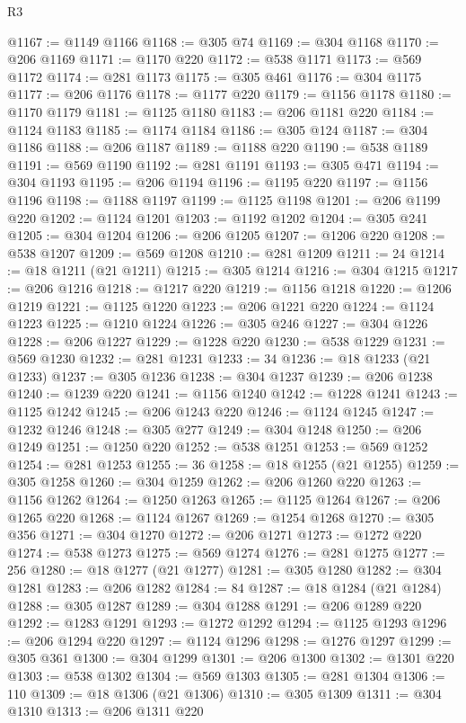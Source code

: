 \begin{lexlean}{R3}
\begin{coremodule}
@1167 := @1149 @1166
@1168 := @305 @74
@1169 := @304 @1168
@1170 := @206 @1169
@1171 := @1170 @220
@1172 := @538 @1171
@1173 := @569 @1172
@1174 := @281 @1173
@1175 := @305 @461
@1176 := @304 @1175
@1177 := @206 @1176
@1178 := @1177 @220
@1179 := @1156 @1178
@1180 := @1170 @1179
@1181 := @1125 @1180
@1183 := @206 @1181 @220
@1184 := @1124 @1183
@1185 := @1174 @1184
@1186 := @305 @124
@1187 := @304 @1186
@1188 := @206 @1187
@1189 := @1188 @220
@1190 := @538 @1189
@1191 := @569 @1190
@1192 := @281 @1191
@1193 := @305 @471
@1194 := @304 @1193
@1195 := @206 @1194
@1196 := @1195 @220
@1197 := @1156 @1196
@1198 := @1188 @1197
@1199 := @1125 @1198
@1201 := @206 @1199 @220
@1202 := @1124 @1201
@1203 := @1192 @1202
@1204 := @305 @241
@1205 := @304 @1204
@1206 := @206 @1205
@1207 := @1206 @220
@1208 := @538 @1207
@1209 := @569 @1208
@1210 := @281 @1209
@1211 := 24
@1214 := @18 @1211 (@21 @1211)
@1215 := @305 @1214
@1216 := @304 @1215
@1217 := @206 @1216
@1218 := @1217 @220
@1219 := @1156 @1218
@1220 := @1206 @1219
@1221 := @1125 @1220
@1223 := @206 @1221 @220
@1224 := @1124 @1223
@1225 := @1210 @1224
@1226 := @305 @246
@1227 := @304 @1226
@1228 := @206 @1227
@1229 := @1228 @220
@1230 := @538 @1229
@1231 := @569 @1230
@1232 := @281 @1231
@1233 := 34
@1236 := @18 @1233 (@21 @1233)
@1237 := @305 @1236
@1238 := @304 @1237
@1239 := @206 @1238
@1240 := @1239 @220
@1241 := @1156 @1240
@1242 := @1228 @1241
@1243 := @1125 @1242
@1245 := @206 @1243 @220
@1246 := @1124 @1245
@1247 := @1232 @1246
@1248 := @305 @277
@1249 := @304 @1248
@1250 := @206 @1249
@1251 := @1250 @220
@1252 := @538 @1251
@1253 := @569 @1252
@1254 := @281 @1253
@1255 := 36
@1258 := @18 @1255 (@21 @1255)
@1259 := @305 @1258
@1260 := @304 @1259
@1262 := @206 @1260 @220
@1263 := @1156 @1262
@1264 := @1250 @1263
@1265 := @1125 @1264
@1267 := @206 @1265 @220
@1268 := @1124 @1267
@1269 := @1254 @1268
@1270 := @305 @356
@1271 := @304 @1270
@1272 := @206 @1271
@1273 := @1272 @220
@1274 := @538 @1273
@1275 := @569 @1274
@1276 := @281 @1275
@1277 := 256
@1280 := @18 @1277 (@21 @1277)
@1281 := @305 @1280
@1282 := @304 @1281
@1283 := @206 @1282
@1284 := 84
@1287 := @18 @1284 (@21 @1284)
@1288 := @305 @1287
@1289 := @304 @1288
@1291 := @206 @1289 @220
@1292 := @1283 @1291
@1293 := @1272 @1292
@1294 := @1125 @1293
@1296 := @206 @1294 @220
@1297 := @1124 @1296
@1298 := @1276 @1297
@1299 := @305 @361
@1300 := @304 @1299
@1301 := @206 @1300
@1302 := @1301 @220
@1303 := @538 @1302
@1304 := @569 @1303
@1305 := @281 @1304
@1306 := 110
@1309 := @18 @1306 (@21 @1306)
@1310 := @305 @1309
@1311 := @304 @1310
@1313 := @206 @1311 @220

\end{coremodule}
\end{lexlean}
